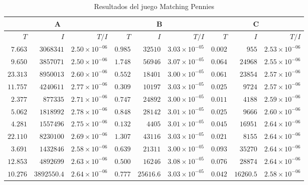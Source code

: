 \begin{table}[ht]
\scriptsize
    \centering
    \begin{tabular}{r r r | r r r | r r r}
    \multicolumn{3}{c}{A} & \multicolumn{3}{c}{B} & \multicolumn{3}{c}{C} \\ \hline
    $T$ & $I$ & $T/I$ & $T$ & $I$ & $T/I$ & $T$ & $I$ & $T/I$ \\  \hline
	$7.663$ & $3068341$ & $2.50 {\times} 10^{-06}$ & $0.985$ & $32510$ & $3.03 {\times} 10^{-05}$ & $0.002$ & $955$ & $2.53 {\times} 10^{-06}$ \\
	$9.650$ & $3857071$ & $2.50 {\times} 10^{-06}$ & $1.748$ & $56946$ & $3.07 {\times} 10^{-05}$ & $0.064$ & $24968$ & $2.55 {\times} 10^{-06}$ \\
	$23.313$ & $8950013$ & $2.60 {\times} 10^{-06}$ & $0.552$ & $18401$ & $3.00 {\times} 10^{-05}$ & $0.061$ & $23854$ & $2.57 {\times} 10^{-06}$ \\
	$11.757$ & $4240611$ & $2.77 {\times} 10^{-06}$ & $0.309$ & $10197$ & $3.03 {\times} 10^{-05}$ & $0.025$ & $9724$ & $2.57 {\times} 10^{-06}$ \\
	$2.377$ & $877335$ & $2.71 {\times} 10^{-06}$ & $0.747$ & $24892$ & $3.00 {\times} 10^{-05}$ & $0.011$ & $4188$ & $2.59 {\times} 10^{-06}$ \\
	$5.062$ & $1818992$ & $2.78 {\times} 10^{-06}$ & $0.848$ & $28142$ & $3.01 {\times} 10^{-05}$ & $0.025$ & $9666$ & $2.60 {\times} 10^{-06}$ \\
	$4.281$ & $1557496$ & $2.75 {\times} 10^{-06}$ & $0.132$ & $4405$ & $3.01 {\times} 10^{-05}$ & $0.045$ & $16951$ & $2.64 {\times} 10^{-06}$ \\
	$22.110$ & $8230100$ & $2.69 {\times} 10^{-06}$ & $1.307$ & $43116$ & $3.03 {\times} 10^{-05}$ & $0.021$ & $8155$ & $2.64 {\times} 10^{-06}$ \\
	$3.691$ & $1432846$ & $2.58 {\times} 10^{-06}$ & $0.639$ & $21311$ & $3.00 {\times} 10^{-05}$ & $0.093$ & $35270$ & $2.64 {\times} 10^{-06}$ \\
	$12.853$ & $4892699$ & $2.63 {\times} 10^{-06}$ & $0.500$ & $16246$ & $3.08 {\times} 10^{-05}$ & $0.076$ & $28874$ & $2.64 {\times} 10^{-06}$ \\ \hline
	$10.276$ & $3892550.4$ & $2.64 {\times} 10^{-06}$ & $0.777$ & $25616.6$ & $3.03 {\times} 10^{-05}$ & $0.042$ & $16260.5$ & $2.58 {\times} 10^{-06}$ \\ \hline
    \end{tabular}
    \caption{Resultados del juego Matching Pennies}
    \label{tab:resultados-matching-pennies}
\end{table}

